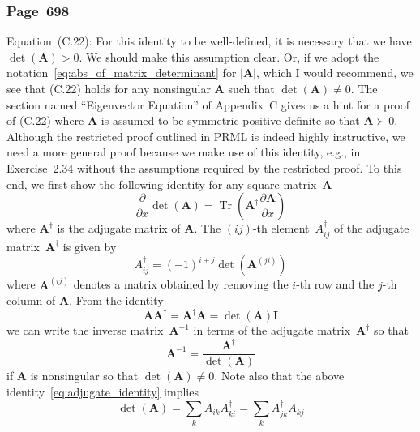 \documentclass[12pt,a4paper]{article}
\newcommand{\erratum}[1]{%
\subsubsection*{#1}
\addcontentsline{toc}{subsection}{#1}}
\begin{document}
\erratum{Page~698}
Equation~(C.22):
For this identity to be well-defined,
it is necessary that we have $\operatorname{det}(\mathbf{A}) > 0$.
We should make this assumption clear.
Or, if we adopt the notation~\eqref{eq:abs_of_matrix_determinant} for $\left|\mathbf{A}\right|$,
which I would recommend,
we see that (C.22) holds for any nonsingular $\mathbf{A}$ such that
$\operatorname{det}(\mathbf{A}) \neq 0$.
The section named ``Eigenvector Equation'' of Appendix~C gives us a hint for a proof of (C.22)
where $\mathbf{A}$ is assumed to be symmetric positive definite so that $\mathbf{A} \succ 0$.
Although the restricted proof outlined in PRML is indeed highly instructive,
we need a more general proof because we make use of this identity, e.g., in Exercise~2.34
without the assumptions required by the restricted proof.
To this end, we first show the following identity for any square matrix~$\mathbf{A}$
\begin{equation}
\frac{\partial}{\partial x} \operatorname{det}\left(\mathbf{A}\right) =
\operatorname{Tr}\left(\mathbf{A}^{\dagger}\frac{\partial\mathbf{A}}{\partial x}\right)
\label{eq:Jacobi_formula}
\end{equation}
where $\mathbf{A}^{\dagger}$ is the adjugate matrix of
$\mathbf{A}$.
The $(ij)$-th element~$A_{ij}^{\dagger}$ of the adjugate matrix~$\mathbf{A}^{\dagger}$ is given by
\begin{equation}
A_{ij}^{\dagger} = (-1)^{i+j} \operatorname{det}\left(\mathbf{A}^{(ji)}\right)
\label{eq:definition_of_adjugate}
\end{equation}
where $\mathbf{A}^{(ij)}$ denotes a matrix obtained by removing
the $i$-th row and the $j$-th column of $\mathbf{A}$.
From the identity
\begin{equation}
\mathbf{A}\mathbf{A}^{\dagger} = \mathbf{A}^{\dagger}\mathbf{A} =
\operatorname{det}(\mathbf{A})\mathbf{I}
\label{eq:adjugate_identity}
\end{equation}
we can write the inverse matrix~$\mathbf{A}^{-1}$ in terms of
the adjugate matrix~$\mathbf{A}^{\dagger}$ so that
\begin{equation}
\mathbf{A}^{-1} = \frac{\mathbf{A}^{\dagger}}{\operatorname{det}(\mathbf{A})}
\label{eq:inverse_in_terms_of_adjugate}
\end{equation}
if $\mathbf{A}$ is nonsingular so that $\operatorname{det}(\mathbf{A}) \neq 0$.
Note also that the above identity~\eqref{eq:adjugate_identity} implies
\begin{equation}
\operatorname{det}(\mathbf{A}) =
\sum_{k} A_{ik} A_{ki}^{\dagger} = \sum_{k} A_{jk}^{\dagger} A_{kj}
\label{eq:determinant_expansion}
\end{equation}
\end{document}
